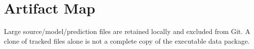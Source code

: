 \section{Artifact Map}\label{artifact-map}

{\def\LTcaptype{table}

}

Large source/model/prediction files are retained locally and excluded from Git. A clone of tracked files alone is not a complete copy of the executable data package.
